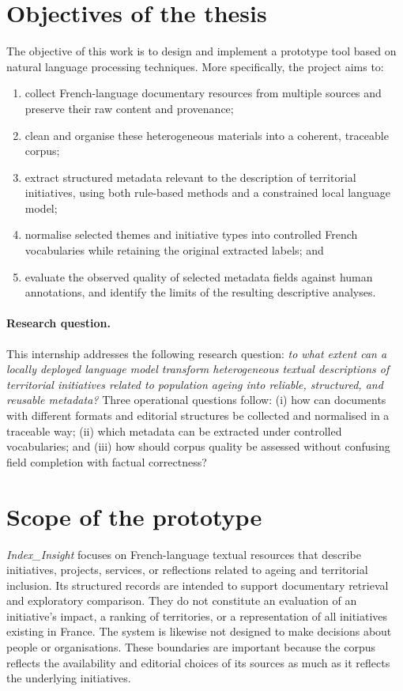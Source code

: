\section{Objectives of the thesis}

The objective of this work is to design and implement a prototype tool based on
natural language processing techniques. More specifically, the project aims to:

\begin{enumerate}
    \item collect French-language documentary resources from multiple sources and
    preserve their raw content and provenance;
    \item clean and organise these heterogeneous materials into a coherent,
    traceable corpus;
    \item extract structured metadata relevant to the description of territorial
    initiatives, using both rule-based methods and a constrained local language
    model;
    \item normalise selected themes and initiative types into controlled French
    vocabularies while retaining the original extracted labels; and
    \item evaluate the observed quality of selected metadata fields against human
    annotations, and identify the limits of the resulting descriptive analyses.
\end{enumerate}

\paragraph{Research question.}
This internship addresses the following research question: \emph{to what extent
can a locally deployed language model transform heterogeneous textual
descriptions of territorial initiatives related to population ageing into
reliable, structured, and reusable metadata?} Three operational questions
follow: (i) how can documents with different formats and editorial structures be
collected and normalised in a traceable way; (ii) which metadata can be extracted
under controlled vocabularies; and (iii) how should corpus quality be assessed
without confusing field completion with factual correctness?

\section{Scope of the prototype}

\textit{Index\_Insight} focuses on French-language textual resources that describe
initiatives, projects, services, or reflections related to ageing and territorial
inclusion. Its structured records are intended to support documentary retrieval and
exploratory comparison. They do not constitute an evaluation of an initiative's
impact, a ranking of territories, or a representation of all initiatives existing
in France. The system is likewise not designed to make decisions about people or
organisations. These boundaries are important because the corpus reflects the
availability and editorial choices of its sources as much as it reflects the
underlying initiatives.

